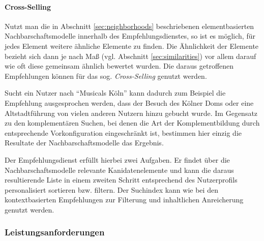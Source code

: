 
\paragraph{Cross-Selling} Nutzt man die in Abschnitt \ref{sec:neighborhoods} beschriebenen elementbasierten Nachbarschaftsmodelle innerhalb des Empfehlungsdienstes, so ist es möglich, für jedes Element weitere ähnliche Elemente zu finden. Die Ähnlichkeit der Elemente bezieht sich dann je nach Maß (vgl. Abschnitt \ref{sec:similarities}) vor allem darauf wie oft diese gemeinsam ähnlich bewertet wurden. Die daraus getroffenen Empfehlungen können für das sog. \textit{Cross-Selling} genutzt werden.

Sucht ein Nutzer nach ``Musicals Köln'' kann dadurch zum Beispiel die Empfehlung ausgesprochen werden, dass der Besuch des Kölner Doms oder eine Altstadtführung von vielen anderen Nutzern hinzu gebucht wurde. Im Gegensatz zu den komplementären Suchen, bei denen die Art der Komplementbildung durch entsprechende Vorkonfiguration eingeschränkt ist, bestimmen hier einzig die Resultate der Nachbarschaftsmodelle das Ergebnis.

Der Empfehlungsdienst erfüllt hierbei zwei Aufgaben. Er findet über die Nachbarschaftsmodelle relevante Kanidatenelemente und kann die daraus resultierende Liste in einem zweiten Schritt entsprechend des Nutzerprofils personalisiert sortieren bzw. filtern. Der Suchindex kann wie bei den kontextbasierten Empfehlungen zur Filterung und inhaltlichen Anreicherung genutzt werden.


\subsubsection{Leistungsanforderungen}\label{sec:performancereq}

